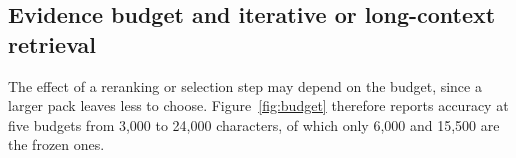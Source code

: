 \subsection{Evidence budget and iterative or long-context retrieval}
\label{sec:evidence}
\label{sec:budget}
\label{sec:search}
The effect of a reranking or selection step may depend on the budget, since a larger pack leaves less to choose. Figure~\ref{fig:budget} therefore reports accuracy at five budgets from 3,000 to 24,000 characters, of which only 6,000 and 15,500 are the frozen ones.



